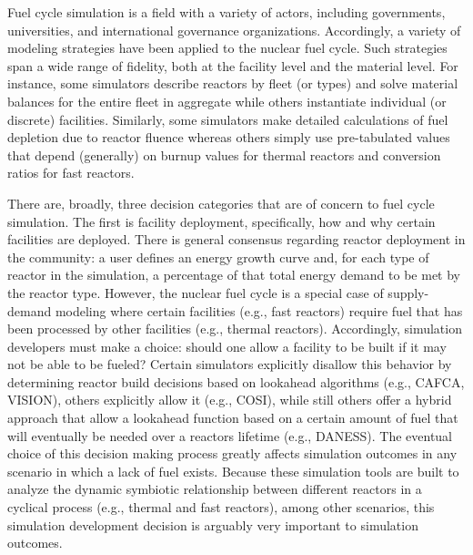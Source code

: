 Fuel cycle simulation is a field with a variety of actors, including
governments, universities, and international governance
organizations. Accordingly, a variety of modeling strategies have been applied
to the nuclear fuel cycle. Such strategies span a wide range of fidelity, both
at the facility level and the material level. For instance, some simulators
describe reactors by fleet (or types) and solve material balances for the entire
fleet in aggregate while others instantiate individual (or discrete)
facilities. Similarly, some simulators make detailed calculations of fuel
depletion due to reactor fluence whereas others simply use pre-tabulated values
that depend (generally) on burnup values for thermal reactors and conversion
ratios for fast reactors.

There are, broadly, three decision categories that are of concern to fuel cycle
simulation. The first is facility deployment, specifically, how and why certain
facilities are deployed. There is general consensus regarding reactor deployment
in the community: a user defines an energy growth curve and, for each type of
reactor in the simulation, a percentage of that total energy demand to be met by
the reactor type. However, the nuclear fuel cycle is a special case of
supply-demand modeling where certain facilities (e.g., fast reactors) require
fuel that has been processed by other facilities (e.g., thermal
reactors). Accordingly, simulation developers must make a choice: should one
allow a facility to be built if it may not be able to be fueled? Certain
simulators explicitly disallow this behavior by determining reactor build
decisions based on lookahead algorithms (e.g., CAFCA, VISION), others explicitly
allow it (e.g., COSI), while still others offer a hybrid approach that allow a
lookahead function based on a certain amount of fuel that will eventually be
needed over a reactors lifetime (e.g., DANESS). The eventual choice of this
decision making process greatly affects simulation outcomes in any scenario in
which a lack of fuel exists. Because these simulation tools are built to analyze
the dynamic symbiotic relationship between different reactors in a cyclical
process (e.g., thermal and fast reactors), among other scenarios, this
simulation development decision is arguably very important to simulation
outcomes.

